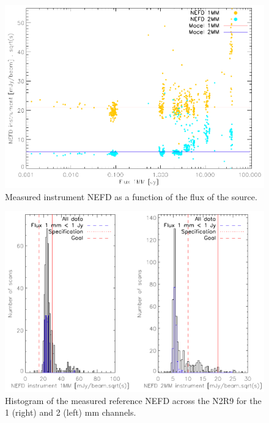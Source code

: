 \begin{figure}
\begin{center}
\includegraphics[clip, angle=0, scale =0.8]{Figures/NEFDIndScans/nefd_flux1mm_run22.pdf}
\caption{Measured instrument NEFD as a function of the flux of the source.}
\label{fig:nefdvsflux}
\end{center}
\end{figure}
\begin{figure}
\begin{center}
\includegraphics[clip, angle=0, scale =0.8]{Figures/NEFDIndScans/hist_nefd_ref_run22.pdf}
\caption{Histogram of the measured reference NEFD across the N2R9 for the 1 (right) and 2 (left) mm channels.}
\label{fig:nefdhist}
\end{center}
\end{figure}
 

